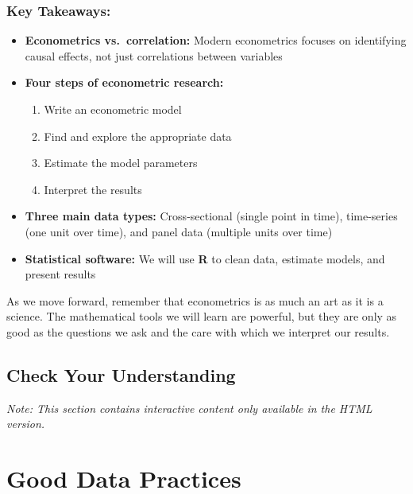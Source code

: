 \documentclass[
  letterpaper,
  DIV=11,
  numbers=noendperiod]{scrreprt}
\providecommand{\tightlist}{%
  \setlength{\itemsep}{0pt}\setlength{\parskip}{0pt}}
\begin{document}
\subsection{Key Takeaways:}\label{key-takeaways}

\begin{itemize}
\item
  \textbf{Econometrics vs.~correlation:} Modern econometrics focuses on
  identifying causal effects, not just correlations between variables
\item
  \textbf{Four steps of econometric research:}

  \begin{enumerate}
  \def\labelenumi{\arabic{enumi}.}
  \tightlist
  \item
    Write an econometric model
  \item
    Find and explore the appropriate data
  \item
    Estimate the model parameters
  \item
    Interpret the results
  \end{enumerate}
\item
  \textbf{Three main data types:} Cross-sectional (single point in
  time), time-series (one unit over time), and panel data (multiple
  units over time)
\item
  \textbf{Statistical software:} We will use \textbf{R} to clean data,
  estimate models, and present results
\end{itemize}

As we move forward, remember that econometrics is as much an art as it
is a science. The mathematical tools we will learn are powerful, but
they are only as good as the questions we ask and the care with which we
interpret our results.

\section{Check Your Understanding}\label{check-your-understanding}

\emph{Note: This section contains interactive content only available in
the HTML version.}


\chapter{Good Data Practices}\label{sec-data-practices}
\end{document}
